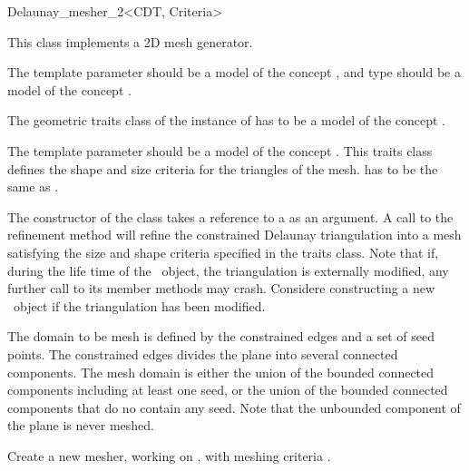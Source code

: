 \begin{ccRefClass}{Delaunay_mesher_2<CDT, Criteria>}

This class implements a 2D mesh generator.

\ccParameters The template parameter  should be a model of the
concept , and type 
should be a model of the concept .

The geometric traits class of the instance of  has to be
a model of the concept .

The template parameter  should be a model of the concept
. This traits class defines the shape and size
criteria for the triangles of the mesh.  has to
be the same as .


The constructor of the class \ccRefName{} takes a reference to a 
as an argument. A call to the refinement method  will
refine the constrained Delaunay triangulation into a mesh satisfying the
size and shape criteria specified in the traits class. Note that if, during
the life time of the \ccRefName\ object, the triangulation is externally
modified, any further call to its member methods may crash. Considere
constructing a new \ccRefName\ object if the triangulation has been
modified.


The domain to be mesh is defined by the constrained edges and a set of seed
points. The constrained edges divides the plane into several connected
components.  The mesh domain is either the union of the bounded connected
components including at least one seed, or the union of the bounded
connected components that do no contain any seed. Note that the unbounded
component of the plane is never meshed.


\ccTypes 
{}

\ccCreation
{}

{Create a new mesher, working on , with meshing criteria
  .}


\end{ccRefClass}

